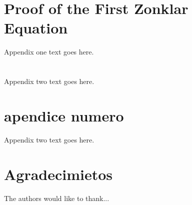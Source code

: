 \documentclass[journal]{IEEEtran}
\begin{document}

%


\appendices
\section{Proof of the First Zonklar Equation}
Appendix one text goes here. \cite{IEEEhowto:kopka}

\section{}
Appendix two text goes here.

\section{apendice numero }
Appendix two text goes here.
\section*{Agradecimietos}


The authors would like to thank...


\ifCLASSOPTIONcaptionsoff
  \newpage
\fi
\end{document}
